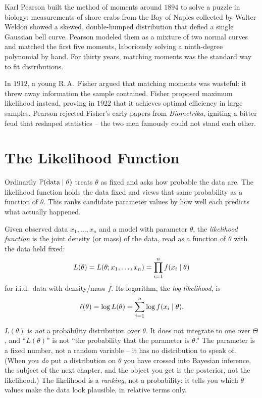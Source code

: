 \begin{historybox}
Karl Pearson built the method of moments around $1894$ to solve a puzzle in
biology: measurements of shore crabs from the Bay of Naples collected by Walter
Weldon showed a skewed, double-humped distribution that defied a single Gaussian
bell curve. Pearson modeled them as a mixture of two normal curves and matched
the first five moments, laboriously solving a ninth-degree polynomial by hand.
For thirty years, matching moments was the standard way to fit distributions.

In $1912$, a young R.\,A.\ Fisher argued that matching moments was wasteful:
it threw away information the sample contained. Fisher proposed maximum
likelihood instead, proving in $1922$ that it achieves optimal efficiency in large
samples. Pearson rejected Fisher's early papers from \emph{Biometrika}, igniting
a bitter feud that reshaped statistics -- the two men famously could not stand
each other.
\end{historybox}

\section{The Likelihood Function}
\label{ch30:likelihood}

Ordinarily $\operatorname{\mathbb{P}}(\text{data} \mid \theta)$ treats $\theta$ as fixed
and asks how probable the data are. The likelihood function holds the data fixed and views that same probability as a function of $\theta$. This ranks candidate parameter values by how well each predicts what actually happened.

\begin{definition}
\label{ch30:def-likelihood}
Given observed data $x_1,\dots,x_n$ and a model with parameter $\theta$, the
\emph{likelihood function} is the joint density (or mass) of the data, read as a
function of $\theta$ with the data held fixed:
\[
  L(\theta) = L(\theta; x_1,\dots,x_n) = \prod_{i=1}^n f(x_i \mid \theta)
\]
for i.i.d.\ data with density/mass $f$. Its logarithm, the \emph{log-likelihood},
is
\[
  \ell(\theta) = \log L(\theta) = \sum_{i=1}^n \log f(x_i \mid \theta).
\]
\end{definition}

\begin{trapbox}
$L(\theta)$ is \emph{not} a probability distribution over $\theta$. It does not
integrate to one over $\Theta$, and ``$L(\theta)$'' is not ``the probability
that the parameter is $\theta$.'' The parameter is a fixed number, not a random
variable -- it has no distribution to speak of. (When you \emph{do} put a
distribution on $\theta$ you have crossed into Bayesian inference, the subject
of the next chapter, and the object you get is the posterior, not the
likelihood.) The likelihood is a \emph{ranking}, not a probability: it tells you
which $\theta$ values make the data look plausible, in relative terms only.
\end{trapbox}

